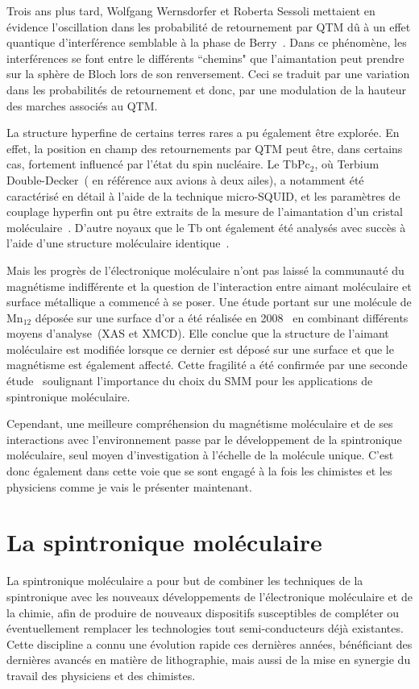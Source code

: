 Trois ans plus tard, Wolfgang Wernsdorfer et Roberta Sessoli mettaient en évidence l'oscillation dans les probabilité de retournement par QTM dû à un effet quantique d'interférence semblable à la phase de Berry~\cite{Wernsdorfer1999}. Dans ce phénomène, les interférences se font entre le différents ``chemins" que l’aimantation peut prendre sur la sphère de Bloch lors de son renversement. Ceci se traduit par une variation dans les probabilités de retournement et donc, par une modulation de la hauteur des marches associés au QTM.

La structure hyperfine de certains terres rares a pu également être explorée. En effet, la position en champ des retournements par QTM peut être, dans certains cas, fortement influencé par l'état du spin nucléaire. Le TbPc$_{2}$, où Terbium Double-Decker~( en référence aux avions à deux ailes), a notamment été caractérisé en détail à l'aide de la technique micro-SQUID, et les paramètres de couplage hyperfin ont pu être extraits de la mesure de l'aimantation d'un cristal moléculaire~\cite{Ishikawa2005}. D'autre noyaux que le Tb ont également été analysés avec succès à l'aide d'une structure moléculaire identique~\cite{Ishikawa2005a}.

Mais les progrès de l'électronique moléculaire n'ont pas laissé la communauté du magnétisme indifférente et la question de l'interaction entre aimant moléculaire et surface métallique a commencé à se poser. Une étude portant sur une molécule de Mn$_{12}$ déposée sur une surface d'or a été réalisée en 2008~\cite{Mannini2008} en combinant différents moyens d'analyse~(XAS et XMCD). Elle conclue que la structure de l'aimant moléculaire est modifiée lorsque ce dernier est déposé sur une surface et que le magnétisme est également affecté. Cette fragilité a été confirmée par une seconde étude~\cite{Mannini2009} soulignant l'importance du choix du SMM pour les applications de spintronique moléculaire.

Cependant, une meilleure compréhension du magnétisme moléculaire et de ses interactions avec l’environnement passe par le développement de la spintronique moléculaire, seul moyen d'investigation à l'échelle de la molécule unique. C'est donc également dans cette voie que se sont engagé à la fois les chimistes et les physiciens comme je vais le présenter maintenant.


\section{La spintronique moléculaire}
La spintronique moléculaire a pour but de combiner les techniques de la spintronique avec les nouveaux développements de l'électronique moléculaire et de la chimie, afin de produire de nouveaux dispositifs susceptibles de compléter ou éventuellement remplacer les technologies tout semi-conducteurs déjà existantes. Cette discipline a connu une évolution rapide ces dernières années, bénéficiant des dernières avancés en matière de lithographie, mais aussi de la mise en synergie du travail des physiciens et des chimistes. 

